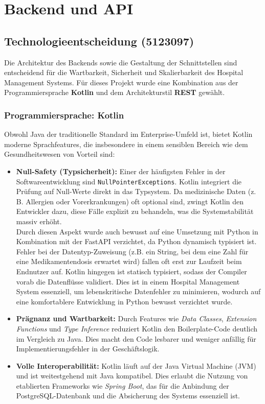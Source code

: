 \section{Backend und API}
\subsection{Technologieentscheidung (5123097)}

Die Architektur des Backends sowie die Gestaltung der Schnittstellen sind entscheidend für die Wartbarkeit, Sicherheit und Skalierbarkeit des Hospital Management Systems. 
Für dieses Projekt wurde eine Kombination aus der Programmiersprache \textbf{Kotlin} und dem Architekturstil \textbf{REST} gewählt.

\subsubsection{Programmiersprache: Kotlin}
Obwohl Java der traditionelle Standard im Enterprise-Umfeld ist, bietet Kotlin moderne Sprachfeatures, die insbesondere in einem sensiblen Bereich wie dem Gesundheitswesen von Vorteil sind:

\begin{itemize}
    \item \textbf{Null-Safety (Typsicherheit):} Einer der häufigsten Fehler in der Softwareentwicklung sind \texttt{NullPointerExceptions}. 
    Kotlin integriert die Prüfung auf Null-Werte direkt in das Typsystem. 
    Da medizinische Daten (z. B. Allergien oder Vorerkrankungen) oft optional sind, zwingt Kotlin den Entwickler dazu, diese Fälle explizit zu behandeln, was die Systemstabilität massiv erhöht. \\
    Durch diesen Aspekt wurde auch bewusst auf eine Umsetzung mit Python in Kombination mit der FastAPI verzichtet, da Python dynamisch typisiert ist. 
    Fehler bei der Datentyp-Zuweisung (z.B. ein String, bei dem eine Zahl für eine Medikamentendosis erwartet wird) fallen oft erst zur Laufzeit beim Endnutzer auf. 
    Kotlin hingegen ist statisch typisiert, sodass der Compiler vorab die Datenflüsse validiert. Dies ist in einem Hospital Management System essenziell, um lebenskritische Datenfehler zu minimieren, wodurch auf eine komfortablere Entwicklung in Python bewusst verzichtet wurde.
    \item \textbf{Prägnanz und Wartbarkeit:} Durch Features wie \textit{Data Classes}, \textit{Extension Functions} und \textit{Type Inference} reduziert Kotlin den Boilerplate-Code deutlich im Vergleich zu Java. Dies macht den Code lesbarer und weniger anfällig für Implementierungsfehler in der Geschäftslogik.
    \item \textbf{Volle Interoperabilität:} Kotlin läuft auf der Java Virtual Machine (JVM) und ist weitestgehend mit Java kompatibel. Dies erlaubt die Nutzung von etablierten Frameworks wie \textit{Spring Boot}, das für die Anbindung der PostgreSQL-Datenbank und die Absicherung des Systems essenziell ist.
\end{itemize}

